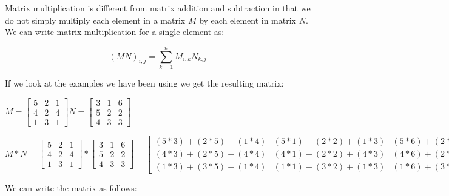 \documentclass[12pt]{article}
\begin{document}
Matrix multiplication is different from matrix addition and subtraction in that we do not simply multiply each element in a matrix $M$ by each element in matrix $N$. We can write matrix multiplication for a single element as:

$$(M N)_{i, j} = \sum_{k = 1}^{n} M_{i, k}N_{k, j}$$

If we look at the examples we have been using we get the resulting matrix:
 \begin{center}
$M = \begin{bmatrix} 5 & 2 & 1 \\ 4 & 2 & 4 \\ 1 & 3 & 1 \end{bmatrix}
  N = \begin{bmatrix} 3 & 1 & 6 \\ 5 & 2 & 2 \\ 4 & 3 & 3 \end{bmatrix}
$
\end{center}
\begin{center}
$M * N =
 \begin{bmatrix} 5 & 2 & 1 \\ 4 & 2 & 4 \\ 1 & 3 & 1 \end{bmatrix}  *
  \begin{bmatrix} 3 & 1 & 6 \\  5 & 2 & 2 \\ 4 & 3 & 3 \end{bmatrix} = 
  \begin{bmatrix} (5*3) + (2*5) + (1*4) & (5*1) + (2*2) + (1*3) & (5*6) + (2*2) + (1*3) \\ 
                           (4*3) + (2*5) + (4*4) & (4*1) + (2*2) + (4*3) & (4*6) + (2*2) + (4*3) \\ 
                           (1*3) + (3*5) + (1*4) & (1*1) + (3*2) + (1*3) & (1*6) + (3*2) + (1*3) 
  \end{bmatrix} =
  \begin{bmatrix} 9 & 12 & 37 \\ 38 & 20 & 40 \\ 22 & 10 & 15 \end{bmatrix}
$
\end{center}
We can write the matrix as follows:
\end{document}
